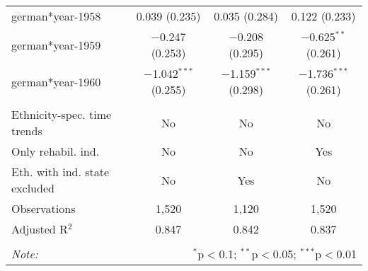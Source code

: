 \begin{table}[!h]
\begin{tabular}{@{\extracolsep{5pt}}lccc}
  german*year-1958 & 0.039 (0.235) & 0.035 (0.284) & 0.122 (0.233) \\ 
  german*year-1959 & $-$0.247 (0.253) & $-$0.208 (0.295) & $-$0.625$^{**}$ (0.261) \\ 
  german*year-1960 & $-$1.042$^{***}$ (0.255) & $-$1.159$^{***}$ (0.298) & $-$1.736$^{***}$ (0.261) \\ 
 \hline \\[-1.8ex] 
Ethnicity-spec. time trends & No & No & No \\ 
Only rehabil. ind. & No & No & Yes \\ 
Eth. with ind. state excluded & No & Yes & No \\ 
Observations & 1,520 & 1,120 & 1,520 \\ 
Adjusted R$^{2}$ & 0.847 & 0.842 & 0.837 \\ 
\hline 
\hline \\[-1.8ex] 
\textit{Note:}  & \multicolumn{3}{r}{$^{*}$p$<$0.1; $^{**}$p$<$0.05; $^{***}$p$<$0.01} \\ 
\end{tabular} 
\end{table} 
